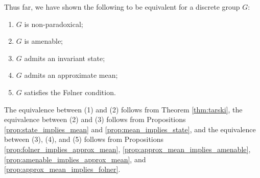 Thus far, we have shown the following to be equivalent for a discrete group $G$:
\begin{enumerate}[(1)]
  \item $G$ is non-paradoxical;
  \item $G$ is amenable;
  \item $G$ admits an invariant state;
  \item $G$ admits an approximate mean;
  \item $G$ satisfies the Følner condition.
\end{enumerate}
The equivalence between (1) and (2) follows from Theorem \ref{thm:tarski}, the equivalence between (2) and (3) follows from Propositions \ref{prop:state_implies_mean} and \ref{prop:mean_implies_state}, and the equivalence between (3), (4), and (5) follows from Propositions \ref{prop:folner_implies_approx_mean}, \ref{prop:approx_mean_implies_amenable}, \ref{prop:amenable_implies_approx_mean}, and \ref{prop:approx_mean_implies_folner}.
